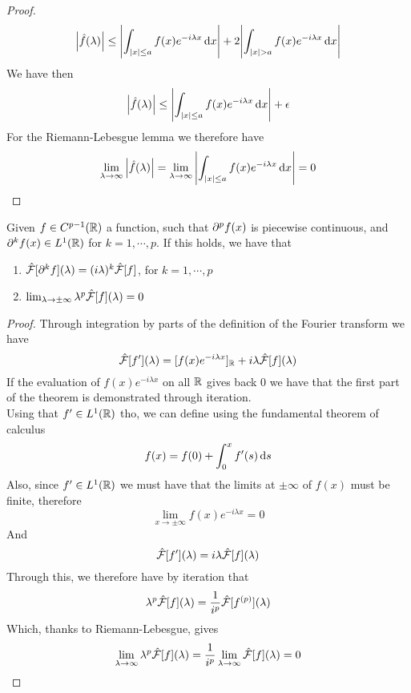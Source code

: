 \documentclass[../complete.tex]{subfiles}
\begin{document}
\begin{proof}
\begin{equation*}
		\abs{\hat{f}(\lambda)}\le\abs{\int_{\abs{x}\le a}^{}f(x)e^{-i\lambda x}\operatorname{d\!} x}+2\abs{\int_{\abs{x}>a}^{}f(x)e^{-i\lambda x}\operatorname{d\!} x}
	\end{equation*}
	We have then
	\begin{equation*}
		\abs{\hat{f}(\lambda)}\le\abs{\int_{\abs{x}\le a}^{}f(x)e^{-i\lambda x}\operatorname{d\!} x}+\epsilon
	\end{equation*}
	For the Riemann-Lebesgue lemma we therefore have
	\begin{equation*}
		\lim_{\lambda\to\infty}\abs{\hat{f}(\lambda)}=\lim_{\lambda\to\infty}\abs{\int_{\abs{x}\le a}^{}f(x)e^{-i\lambda x}\operatorname{d\!} x}=0
	\end{equation*}
\end{proof}
\begin{thm}
	Given $f\in C^{p-1}(\mathbb{R})$ a function, such that $\partial^{p}f(x)$ is piecewise continuous, and $\partial^k f(x)\in L^1(\mathbb{R})$ for $k=1,\cdots,p$. If this holds, we have that
	\begin{enumerate}
		\item $\hat{\mathcal{F}}[\partial^kf](\lambda)=(i\lambda)^k\hat{\mathcal{F}}[f]$, for $k=1,\cdots,p$
		\item $\lim_{\lambda\to\pm\infty}\lambda^p\hat{\mathcal{F}}[f](\lambda)=0$
	\end{enumerate}
\end{thm}
\begin{proof}
	Through integration by parts of the definition of the Fourier transform we have
	\begin{equation*}
		\hat{\mathcal{F}}[f'](\lambda)=[f(x)e^{-i\lambda x}]_{\mathbb{R}} +i\lambda\hat{\mathcal{F}}[f](\lambda)
	\end{equation*}
	If the evaluation of $f(x)e^{-i\lambda x}$ on all $\mathbb{R}$ gives back $0$ we have that the first part of the theorem is demonstrated through iteration.\\
	Using that $f'\in L^1(\mathbb{R})$ tho, we can define using the fundamental theorem of calculus
	\begin{equation*}
		f(x)=f(0)+\int_{0}^{x}f'(s)\operatorname{d\!} s
	\end{equation*}
	Also, since $f'\in L^1(\mathbb{R})$ we must have that the limits at $\pm\infty$ of $f(x)$ must be finite, therefore
	\begin{equation*}
		\lim_{x\to\pm\infty}f(x)e^{-i\lambda x}=0
	\end{equation*}
	And
	\begin{equation*}
		\hat{\mathcal{F}}[f'](\lambda)=i\lambda\hat{\mathcal{F}}[f](\lambda)
	\end{equation*}
	Through this, we therefore have by iteration that
	\begin{equation*}
		\lambda^p\hat{\mathcal{F}}[f](\lambda)=\frac{1}{i^p}\hat{\mathcal{F}}[f^{(p)}](\lambda)
	\end{equation*}
	Which, thanks to Riemann-Lebesgue, gives
	\begin{equation*}
		\lim_{\lambda\to\infty}\lambda^p\hat{\mathcal{F}}[f](\lambda)=\frac{1}{i^p}\lim_{\lambda\to\infty}\hat{\mathcal{F}}[f](\lambda)=0
	\end{equation*}
\end{proof}
\end{document}
